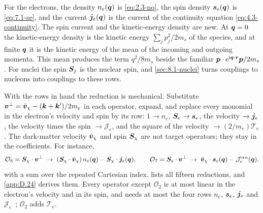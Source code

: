 \noindent For the electrons, the density $n_e(\bm{q})$ is \cref{eq:2.3-nq}, the spin density $\bm{s}_e(\bm{q})$ is \cref{eq:7.1-se}, and the current $\bm{j}_e(\bm{q})$ is the current of the continuity equation \cref{eq:4.3-continuity}. The spin current and the kinetic-energy density are new. At $\bm{q} = 0$ the kinetic-energy density is the kinetic energy $\sum_j p_j^2/2m_s$ of the species, and at finite $\bm{q}$ it is the kinetic energy of the mean of the incoming and outgoing momenta. This mean produces the term $q^2/8m_s$ beside the familiar $\bm{p}\cdot\mathrm{e}^{\mathrm{i}\bm{q}\cdot\bm{r}}\bm{p}/2m_s$. For nuclei the spin $\bm{S}_j$ is the nuclear spin, and \cref{sec:8.1-nuclei} turns couplings to nucleons into couplings to these rows.

With the rows in hand the reduction is mechanical. Substitute $\bm{v}^\perp = \bar{\bm{v}}_\chi - (\bm{k} + \bm{k}')/2m_e$ in each operator, expand, and replace every monomial in the electron's velocity and spin by its row: $1 \to n_e$, $\bm{S}_e \to \bm{s}_e$, the velocity $\to \bm{j}_e$, the velocity times the spin $\to \mathcal{J}_e$, and the square of the velocity $\to (2/m_e)\mathcal{T}_e$. The dark-matter velocity $\bar{\bm{v}}_\chi$ and spin $\bm{S}_\chi$ are not target operators; they stay in the coefficients. For instance,
\begin{equation}
  \mathcal{O}_8 = \bm{S}_\chi\cdot\bm{v}^\perp \;\to\; (\bm{S}_\chi\cdot\bar{\bm{v}}_\chi)\,n_e(\bm{q}) - \bm{S}_\chi\cdot\bm{j}_e(\bm{q}) ,
  \qquad
  \mathcal{O}_7 = \bm{S}_e\cdot\bm{v}^\perp \;\to\; \bar{\bm{v}}_\chi\cdot\bm{s}_e(\bm{q}) - \mathcal{J}^{\alpha\alpha}_e(\bm{q}) ,
  \label{eq:8.1-O7O8}
\end{equation}
with a sum over the repeated Cartesian index.  lists all fifteen reductions, and \cref{app:D.24} derives them. Every operator except $\mathcal{O}_2$ is at most linear in the electron's velocity and in its spin, and needs at most the four rows $n_e$, $\bm{s}_e$, $\bm{j}_e$ and $\mathcal{J}_e$~\cite[Table~III]{trickle2022effective}; $\mathcal{O}_2$ adds $\mathcal{T}_e$.

